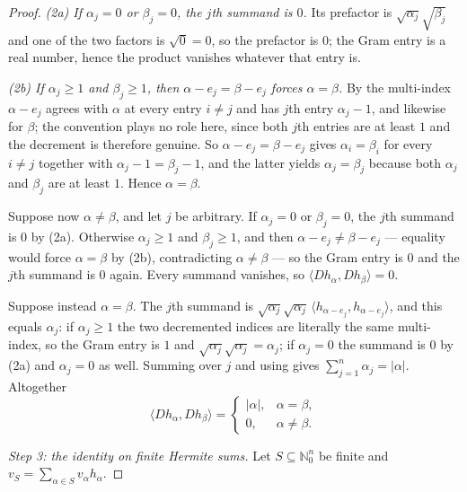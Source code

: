 \begin{proof}
\emph{(2a) If $\alpha_j = 0$ or $\beta_j = 0$, the $j$th summand is $0$.}  Its
prefactor is $\sqrt{\alpha_j}\sqrt{\beta_j}$ and one of the two factors is
$\sqrt{0} = 0$, so the prefactor is $0$; the Gram entry is a real number, hence
the product vanishes whatever that entry is.

\emph{(2b) If $\alpha_j \geq 1$ and $\beta_j \geq 1$, then
$\alpha - e_j = \beta - e_j$ forces $\alpha = \beta$.}  By
 the multi-index $\alpha - e_j$ agrees with $\alpha$ at
every entry $i \neq j$ and has $j$th entry $\alpha_j - 1$, and likewise for
$\beta$; the convention plays no role here, since both $j$th entries are at least
$1$ and the decrement is therefore genuine.  So $\alpha - e_j = \beta - e_j$ gives
$\alpha_i = \beta_i$ for every $i \neq j$ together with
$\alpha_j - 1 = \beta_j - 1$, and the latter yields $\alpha_j = \beta_j$ because
both $\alpha_j$ and $\beta_j$ are at least $1$.  Hence $\alpha = \beta$.

Suppose now $\alpha \neq \beta$, and let $j$ be arbitrary.  If $\alpha_j = 0$ or
$\beta_j = 0$, the $j$th summand is $0$ by (2a).  Otherwise $\alpha_j \geq 1$ and
$\beta_j \geq 1$, and then $\alpha - e_j \neq \beta - e_j$ --- equality would
force $\alpha = \beta$ by (2b), contradicting $\alpha \neq \beta$ --- so the Gram
entry is $0$ and the $j$th summand is $0$ again.  Every summand vanishes, so
$\langle D h_\alpha, D h_\beta\rangle = 0$.

Suppose instead $\alpha = \beta$.  The $j$th summand is
$\sqrt{\alpha_j}\sqrt{\alpha_j}\,\langle h_{\alpha-e_j}, h_{\alpha-e_j}\rangle$,
and this equals $\alpha_j$: if $\alpha_j \geq 1$ the two decremented indices are
literally the same multi-index, so the Gram entry is $1$ and
$\sqrt{\alpha_j}\sqrt{\alpha_j} = \alpha_j$; if $\alpha_j = 0$ the summand is $0$
by (2a) and $\alpha_j = 0$ as well.  Summing over $j$ and using
 gives $\sum_{j=1}^n \alpha_j = |\alpha|$.  Altogether
\begin{equation*}
  \langle D h_\alpha, D h_\beta\rangle
    = \begin{cases}
        |\alpha|, & \alpha = \beta,\\
        0, & \alpha \neq \beta.
      \end{cases} \tag{2}
\end{equation*}

\emph{Step 3: the identity on finite Hermite sums.}
Let $S \subseteq \mathbb{N}_0^n$ be finite and $v_S = \sum_{\alpha\in S} v_\alpha h_\alpha$.


\end{proof}
